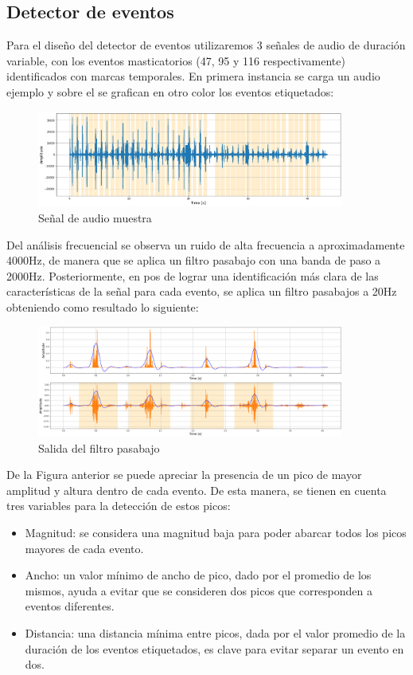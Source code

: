 \documentclass[11pt]{charter}
\begin{document}
\subsection{Detector de eventos}
Para el diseño del detector de eventos utilizaremos  3 señales de audio de duración variable, con los eventos masticatorios (47, 95 y 116 respectivamente) identificados con marcas temporales. 
En primera instancia se carga un audio ejemplo y sobre el se grafican en otro color los eventos etiquetados:
\begin{figure}[H]
	\centering 
	\includegraphics[width=0.9\textwidth, scale=1]{./Figuras/sample.png}
	\caption{Señal de audio muestra}
	\label{fig:sample}
\end{figure}
Del análisis frecuencial se observa un ruido de alta frecuencia a aproximadamente 4000Hz, de manera que se aplica un filtro pasabajo con una banda de paso a 2000Hz. Posteriormente, en pos de lograr una identificación más clara de las características de la señal para cada evento, se aplica un filtro pasabajos a 20Hz obteniendo como resultado lo siguiente:
\begin{figure}[H]
	\centering 
	\includegraphics[width=0.9\textwidth, scale=1]{./Figuras/filter.png}
	\caption{Salida del filtro pasabajo}
	\label{fig:samplefilter}
\end{figure}
De la Figura anterior se puede apreciar la presencia de un pico de mayor amplitud y altura dentro de cada evento. De esta manera, se tienen en cuenta tres variables para la detección de estos picos:
\begin{itemize}
	\item  Magnitud: se considera una magnitud baja para poder abarcar todos los picos mayores de cada evento.
	\item Ancho: un valor mínimo de ancho de pico, dado por el promedio de los mismos, ayuda a evitar que se consideren dos picos que corresponden a eventos diferentes.
	\item Distancia: una distancia mínima entre picos, dada por el valor promedio de la duración de los eventos etiquetados, es clave para evitar separar un evento en dos.
\end{itemize}
\end{document}
